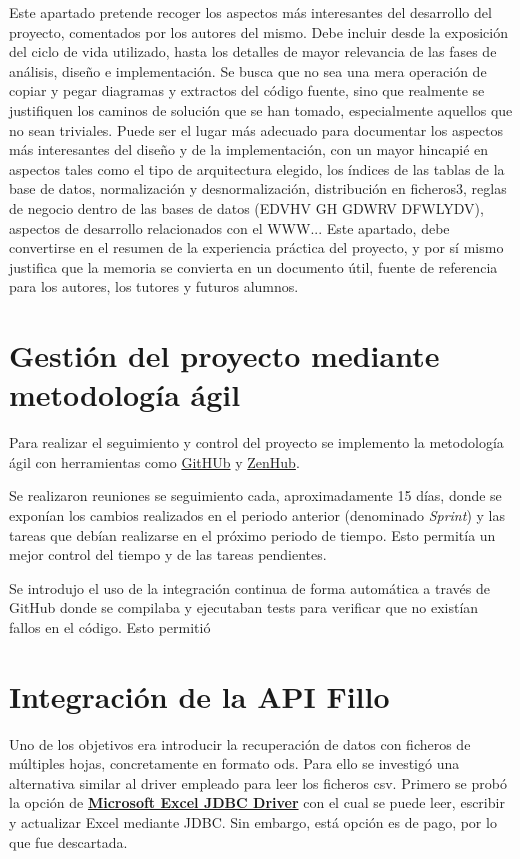 
Este apartado pretende recoger los aspectos más interesantes del desarrollo del proyecto, comentados por los autores del mismo.
Debe incluir desde la exposición del ciclo de vida utilizado, hasta los detalles de mayor relevancia de las fases de análisis, diseño e implementación.
Se busca que no sea una mera operación de copiar y pegar diagramas y extractos del código fuente, sino que realmente se justifiquen los caminos de solución que se han tomado, especialmente aquellos que no sean triviales.
Puede ser el lugar más adecuado para documentar los aspectos más interesantes del diseño y de la implementación, con un mayor hincapié en aspectos tales como el tipo de arquitectura elegido, los índices de las tablas de la base de datos, normalización y desnormalización, distribución en ficheros3, reglas de negocio dentro de las bases de datos (EDVHV GH GDWRV DFWLYDV), aspectos de desarrollo relacionados con el WWW...
Este apartado, debe convertirse en el resumen de la experiencia práctica del proyecto, y por sí mismo justifica que la memoria se convierta en un documento útil, fuente de referencia para los autores, los tutores y futuros alumnos.

\section{Gestión del proyecto mediante metodología ágil}
Para realizar el seguimiento y control del proyecto se implemento la metodología ágil con herramientas como \href{https://github.com/}{GitHUb} y \href{https://www.zenhub.com/}{ZenHub}. 

Se realizaron reuniones se seguimiento cada, aproximadamente 15 días, donde se exponían los cambios realizados en el periodo anterior (denominado \emph{Sprint}) y las tareas que debían realizarse en el próximo periodo de tiempo. Esto permitía un mejor control del tiempo y de las tareas pendientes. 

Se introdujo el uso de la integración continua de forma automática a través de GitHub donde se compilaba y ejecutaban tests para verificar que no existían fallos en el código. Esto permitió 


\section{Integración de la API Fillo}
Uno de los objetivos era introducir la recuperación de datos con ficheros de múltiples hojas, concretamente en formato ods.
Para ello se investigó una alternativa similar al driver empleado para leer los ficheros csv. Primero se probó la opción de \textbf{\href{https://www.cdata.com/drivers/excel/jdbc/}{Microsoft Excel JDBC Driver}} con el cual se puede leer, escribir y actualizar Excel mediante JDBC. Sin embargo, está opción es de pago, por lo que fue descartada. 

